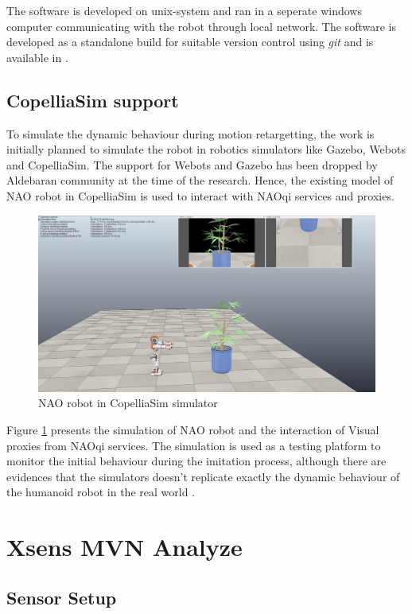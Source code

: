 The software is developed on unix-system and ran in a seperate windows computer communicating with the robot through local network. The software is developed as a standalone build for suitable version control using \textit{git} and is available in 
\cite{github}.

\subsection{CopelliaSim support}
To simulate the dynamic behaviour during motion retargetting, the work is initially planned to simulate the robot in robotics simulators like Gazebo, Webots and CopelliaSim. 
The support for Webots and Gazebo has been dropped by Aldebaran community at the time of the research. Hence, the existing model of NAO robot in CopelliaSim is used to interact 
with NAOqi services and proxies. 


\begin{figure}[h!]
    \centering
    \includegraphics[scale=0.235]{images/copellia-sim.png}\hfill
    \caption{NAO robot in CopelliaSim simulator}\hfill
    \label{fig: copellia-sim}
\end{figure}

Figure \ref{fig: copellia-sim} presents the simulation of NAO robot and the interaction of Visual proxies from NAOqi services. The simulation is 
used as a testing platform to monitor the initial behaviour during the imitation process, although there are evidences that the simulators doesn't replicate exactly the dynamic 
behaviour of the humanoid robot in the real world \cite{ramosponce}. 

\section{Xsens MVN Analyze}


\subsection{Sensor Setup}
